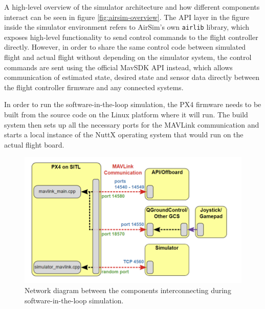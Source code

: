 A high-level overview of the simulator architecture and how different components interact can be seen in figure \ref{fig:airsim-overview}. 
The API layer in the figure inside the simulator environment refers to AirSim's own \texttt{airlib} library, which exposes high-level functionality to send control commands to the flight controller directly.
However, in order to share the same control code between simulated flight and actual flight without depending on the simulator system, the control commands are sent using the official MavSDK API instead, which allows communication of estimated state, desired state and sensor data directly between the flight controller firmware and any connected systems.

In order to run the software-in-the-loop simulation, the PX4 firmware needs to be built from the source code on the Linux platform where it will run.
The build system then sets up all the necessary ports for the MAVLink communication and starts a local instance of the NuttX operating system that would run on the actual flight board.

\begin{figure}
  \centering
  \includegraphics[width=\textwidth,keepaspectratio]{img/px4-ports.png}
  \caption{Network diagram between the components interconnecting during software-in-the-loop simulation.}
  \label{fig:px4-ports}
\end{figure}

